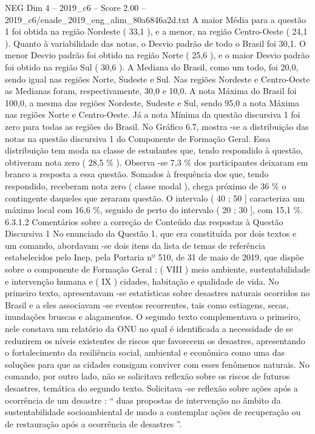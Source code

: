 \begin{textsample}{NEG Dim 4 – 2019\_c6 – Score 2.00 – 2019\_c6/enade\_2019\_eng\_alim\_80a6846a2d.txt}
A maior Média para a questão 1 foi obtida na região Nordeste ( 33,1 ), e a menor, na região Centro-Oeste ( 24,1 ).
Quanto à variabilidade das notas, o Desvio padrão de todo o Brasil foi 30,1.
O menor Desvio padrão foi obtido na região Norte ( 25,6 ), e o maior Desvio padrão foi obtido na região Sul ( 30,6 ).
A Mediana do Brasil, como um todo, foi 20,0, sendo igual nas regiões Norte, Sudeste e Sul.
Nas regiões Nordeste e Centro-Oeste as Medianas foram, respectivamente, 30,0 e 10,0.
A nota Máxima do Brasil foi 100,0, a mesma das regiões Nordeste, Sudeste e Sul, sendo 95,0 a nota Máxima nas regiões Norte e Centro-Oeste.
Já a nota Mínima da questão discursiva 1 foi zero para todas as regiões do Brasil.
No Gráfico 6.7, mostra -se a distribuição das notas na questão discursiva 1 do Componente de Formação Geral.
Essa distribuição tem moda na classe de estudantes que, tendo respondido à questão, obtiveram nota zero ( 28,5 \% ).
Observa -se 7,3 \% dos participantes deixaram em branco a resposta a essa questão.
Somados à frequência dos que, tendo respondido, receberam nota zero ( classe modal ), chega próximo de 36 \% o contingente daqueles que zeraram questão.
O intervalo ( 40 ; 50 ] caracteriza um máximo local com 16,6 \%, seguido de perto do intervalo ( 20 ; 30 ], com 15,1 \%. 6.3.1.2 Comentários sobre a correção de Conteúdo das respostas à Questão Discursiva 1 No enunciado da Questão 1, que era constituída por dois textos e um comando, abordavam -se dois itens da lista de temas de referência estabelecidos pelo Inep, pela Portaria nº 510, de 31 de maio de 2019, que dispõe sobre o componente de Formação Geral : ( VIII ) meio ambiente, sustentabilidade e intervenção humana e ( IX ) cidades, habitação e qualidade de vida.
No primeiro texto, apresentavam -se estatísticas sobre desastres naturais ocorridos no Brasil e a eles associavam -se eventos recorrentes, tais como estiagens, secas, inundações bruscas e alagamentos.
O segundo texto complementava o primeiro, nele constava um relatório da ONU no qual é identificada a necessidade de se reduzirem os níveis existentes de riscos que favorecem os desastres, apresentando o fortalecimento da resiliência social, ambiental e econômica como uma das soluções para que as cidades consigam conviver com esses fenômenos naturais.
No comando, por outro lado, não se solicitava reflexão sobre os riscos de futuros desastres, temática do segundo texto.
Solicitava -se reflexão sobre ações após a ocorrência de um desastre : “ duas propostas de intervenção no âmbito da sustentabilidade socioambiental de modo a contemplar ações de recuperação ou de restauração após a ocorrência de desastres ”.

\end{textsample}
